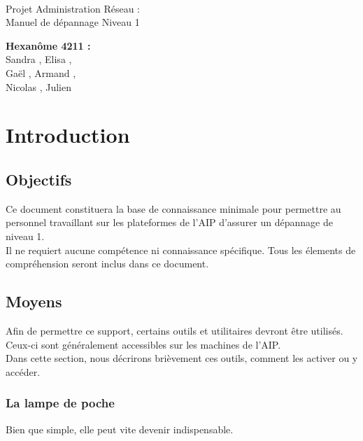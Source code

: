 \documentclass[a4paper]{article}
\begin{document}
\begin{titlepage}
	~ 
	\vfill
	\begin{center}
		\begin{Huge}
			Projet Administration Réseau : \\ Manuel de dépannage Niveau 1\\
		\end{Huge}
	\vfill
		\textbf{Hexanôme 4211 :} 
			\\Sandra {}, Elisa , 
			\\Gaël , Armand , 
			\\Nicolas {}, Julien \\
	\vfill
	\end{center}
	\vfill
\end{titlepage}

\newpage
\tableofcontents
\newpage


\section{Introduction}
\subsection{Objectifs}
Ce document constituera la base de connaissance minimale pour permettre au personnel travaillant sur les plateformes de l'AIP d'assurer un dépannage de niveau 1.\\
Il ne requiert aucune compétence ni connaissance spécifique. Tous les élements de compréhension seront inclus dans ce document.
\subsection{Moyens}
Afin de permettre ce support, certains outils et utilitaires devront être utilisés. Ceux-ci sont généralement accessibles sur les machines de l'AIP.\\
Dans cette section, nous décrirons brièvement ces outils, comment les activer ou y accéder.

\subsubsection{La lampe de poche}
Bien que simple, elle peut vite devenir indispensable.
\end{document}
